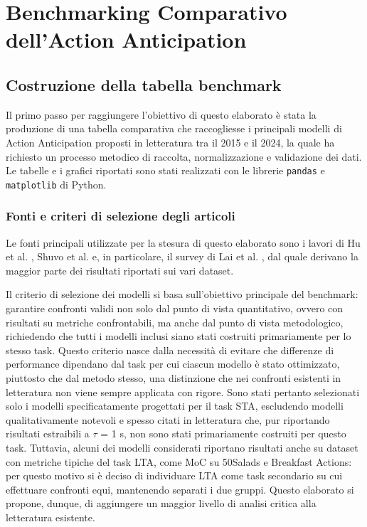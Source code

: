 \chapter{Benchmarking Comparativo dell'Action Anticipation}

\section{Costruzione della tabella benchmark}
Il primo passo per raggiungere l'obiettivo di questo elaborato è stata la produzione di una tabella comparativa che raccogliesse i principali modelli di Action Anticipation proposti in letteratura tra il 2015 e il 2024, la quale ha richiesto un processo metodico di raccolta, normalizzazione e validazione dei dati. Le tabelle e i grafici riportati sono stati realizzati 
con le librerie \texttt{pandas} e \texttt{matplotlib} 
di Python.

\subsection{Fonti e criteri di selezione degli articoli}
\label{criteri}
Le fonti principali utilizzate per la stesura di questo elaborato sono i lavori di Hu et al. \cite{hu2022online}, Shuvo et al. \cite{shuvo2025deep} e, in particolare, il survey di Lai et al. \cite{lai2024human}, dal quale derivano la maggior parte dei risultati riportati sui vari dataset.

Il criterio di selezione dei modelli si basa sull'obiettivo principale del benchmark: garantire confronti validi non solo dal punto di vista quantitativo, ovvero con risultati su metriche confrontabili, ma anche dal punto di vista metodologico, richiedendo che tutti i modelli inclusi siano stati costruiti primariamente per lo stesso task.
Questo criterio nasce dalla necessità di evitare che differenze di performance dipendano dal task per cui ciascun modello è stato ottimizzato, piuttosto che dal metodo stesso, una distinzione che nei confronti esistenti in letteratura non viene sempre applicata con rigore. Sono stati pertanto selezionati solo i modelli specificatamente progettati per il task STA, escludendo modelli qualitativamente notevoli e spesso citati in letteratura che, pur riportando risultati estraibili a $\tau$ = 1 s, non sono stati primariamente costruiti per questo task. Tuttavia, alcuni dei modelli considerati riportano risultati anche su dataset con metriche tipiche del task LTA, come MoC su 50Salads e Breakfast Actions: per questo motivo si è deciso di individuare LTA come task secondario su cui effettuare confronti equi, mantenendo separati i due gruppi.
Questo elaborato si propone, dunque, di aggiungere un maggior livello di analisi critica alla letteratura esistente. 

